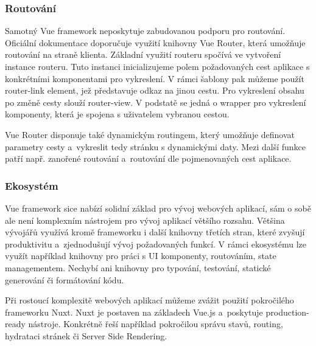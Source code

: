 \subsubsection{Routování}

Samotný Vue framework neposkytuje zabudovanou podporu pro routování. Oficiální dokumentace doporučuje využití knihovny Vue Router, která umožňuje routování na straně klienta. 
Základní využití routeru spočívá ve vytvoření instance routeru. Tuto instanci inicializujeme polem požadovaných cest aplikace s konkrétními komponentami pro vykreslení. 
V rámci šablony pak můžeme použít router-link element, jež představuje odkaz na jinou cestu. Pro vykreslení obsahu po změně cesty slouží router-view. 
V podstatě se jedná o wrapper pro vykreslení komponenty, která je spojena s uživatelem vybranou cestou.

Vue Router disponuje také dynamickým routingem, který umožňuje definovat parametry cesty a~vykreslit tedy stránku s dynamickými daty. 
Mezi další funkce patří např. zanořené routování a~routování dle pojmenovaných cest aplikace.\cite{vue,vuerouter}

\subsubsection{Ekosystém}

Vue framework sice nabízí solidní základ pro vývoj webových aplikací, sám o sobě ale není komplexním nástrojem pro vývoj aplikací většího rozsahu. 
Většina vývojářů využívá kromě frameworku i další knihovny třetích stran, které zvyšují produktivitu a~zjednodušují vývoj požadovaných funkcí. 
V rámci ekosystému lze využít například knihovny pro práci s UI komponenty, routováním, state managementem. 
Nechybí ani knihovny pro typování, testování, statické generování či formátování kódu.

Při rostoucí komplexitě webových aplikací můžeme zvážit použití pokročilého frameworku Nuxt. Nuxt je postaven na základech Vue.js a~poskytuje production-ready nástroje. 
Konkrétně řeší například pokročilou správu stavů, routing, hydrataci stránek či Server Side Rendering.\cite{awesomevue,vue}